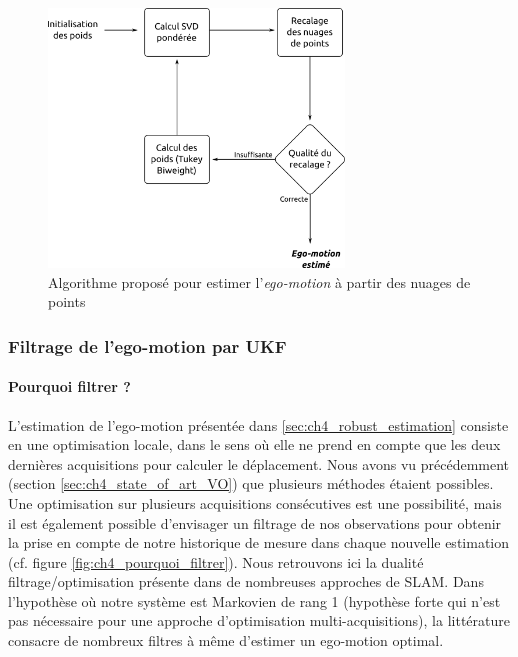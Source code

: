 \begin{figure}
	\centering
	\includegraphics[width=0.7\textwidth]{Chapter4/graphics/overall_scheme_ego.png}
	\caption{Algorithme proposé pour estimer l'\textit{ego-motion} à partir des nuages de points}
	\label{fig:ch4_estimation_ego_motion}
\end{figure}

\subsubsection{Filtrage de l'ego-motion par UKF}
\paragraph{Pourquoi filtrer ?\\}
L'estimation de l'ego-motion présentée dans \ref{sec:ch4_robust_estimation} consiste en une optimisation locale, dans le sens où elle ne prend en compte que les deux dernières acquisitions pour calculer le déplacement. Nous avons vu précédemment (section \ref{sec:ch4_state_of_art_VO}) que plusieurs méthodes étaient possibles. Une optimisation sur plusieurs acquisitions consécutives \cite{Nister2006, Lategahna, Konolige2008} est une possibilité, mais il est également possible d'envisager un filtrage de nos observations pour obtenir la prise en compte de notre historique de mesure dans chaque nouvelle estimation (cf. figure \ref{fig:ch4_pourquoi_filtrer}). Nous retrouvons ici la dualité filtrage/optimisation présente dans de nombreuses approches de SLAM. Dans l'hypothèse où notre système est Markovien de rang 1 (hypothèse forte qui n'est pas nécessaire pour une approche d'optimisation multi-acquisitions), la littérature consacre de nombreux filtres à même d'estimer un ego-motion optimal.\\

